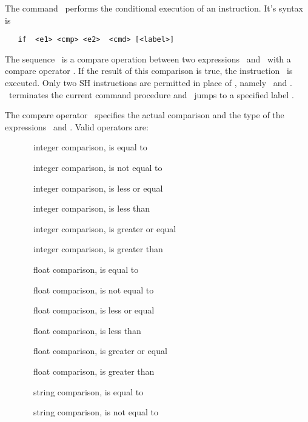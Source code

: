 The command \ performs the conditional execution of an
instruction.  It's syntax is
\begin{verbatim}
   if  <e1> <cmp> <e2>  <cmd> [<label>]
\end{verbatim}
The sequence \ is a compare operation between
two expressions \ and \ with a compare
operator .  If the result of this comparison is true,
the instruction \ is executed.  Only two SH instructions
are permitted in place of , namely \ and
.  \ terminates the current command
procedure and \ jumps to a specified label .

The compare operator \ specifies the actual comparison
and the type of the expressions \ and .  Valid
operators are:
\begin{description}
\item[]  \ integer comparison,  is equal to 
\item[]  \ integer comparison,  is not equal to 
\item[]  \ integer comparison,  is less or equal 
\item[]  \ integer comparison,  is less than 
\item[]  \ integer comparison,  is greater or equal 
\item[]  \ integer comparison,  is greater than 
\item[]  \ float comparison,  is equal to 
\item[]  \ float comparison,  is not equal to 
\item[]  \ float comparison,  is less or equal 
\item[]  \ float comparison,  is less than 
\item[]  \ float comparison,  is greater or equal 
\item[]  \ float comparison,  is greater than 
\item[]  \ string comparison,  is equal to 
\item[]  \ string comparison,  is not equal to 
\end{description}

